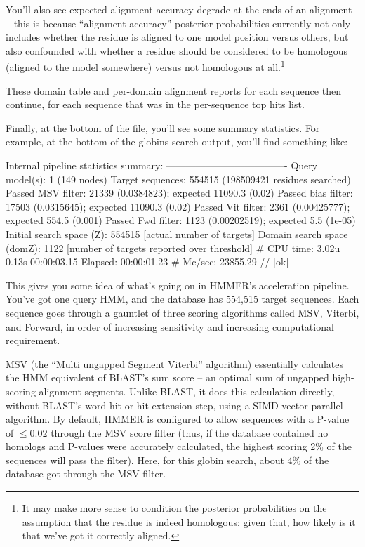 You'll also see expected alignment accuracy degrade at the ends of an
alignment -- this is because ``alignment accuracy'' posterior
probabilities currently not only includes whether the residue is
aligned to one model position versus others, but also confounded with
whether a residue should be considered to be homologous (aligned to
the model somewhere) versus not homologous at all.\footnote{It may
make more sense to condition the posterior probabilities on the
assumption that the residue is indeed homologous: given that, how
likely is it that we've got it correctly aligned.}


These domain table and per-domain alignment reports for each sequence
then continue, for each sequence that was in the per-sequence top hits
list.

Finally, at the bottom of the file, you'll see some summary
statistics.  For example, at the bottom of the globins search output,
you'll find something like:

\begin{samepage}
\begin{sreoutput}
Internal pipeline statistics summary:
-------------------------------------
Query model(s):                            1  (149 nodes)
Target sequences:                     554515  (198509421 residues searched)
Passed MSV filter:                     21339  (0.0384823); expected 11090.3 (0.02)
Passed bias filter:                    17503  (0.0315645); expected 11090.3 (0.02)
Passed Vit filter:                      2361  (0.00425777); expected 554.5 (0.001)
Passed Fwd filter:                      1123  (0.00202519); expected 5.5 (1e-05)
Initial search space (Z):             554515  [actual number of targets]
Domain search space  (domZ):            1122  [number of targets reported over threshold]
# CPU time: 3.02u 0.13s 00:00:03.15 Elapsed: 00:00:01.23
# Mc/sec: 23855.29
//
[ok]
\end{sreoutput}
\end{samepage}

This gives you some idea of what's going on in HMMER's acceleration
pipeline. You've got one query HMM, and the database has 554,515
target sequences. Each sequence goes through a gauntlet of three
scoring algorithms called MSV, Viterbi, and Forward, in order of 
increasing sensitivity and increasing computational requirement. 

MSV (the ``Multi ungapped Segment Viterbi'' algorithm) essentially
calculates the HMM equivalent of BLAST's sum score -- an optimal sum
of ungapped high-scoring alignment segments. Unlike BLAST, it does
this calculation directly, without BLAST's word hit or hit extension
step, using a SIMD vector-parallel algorithm. By default, HMMER is
configured to allow sequences with a P-value of $\leq 0.02$ through
the MSV score filter (thus, if the database contained no homologs and
P-values were accurately calculated, the highest scoring 2\% of the
sequences will pass the filter). Here, for this globin search, about
4\% of the database got through the MSV filter.

